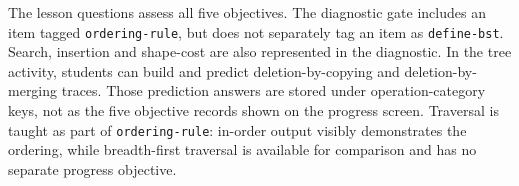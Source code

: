 The lesson questions assess all five objectives. The diagnostic gate includes an item tagged \texttt{ordering-rule}, but does not separately tag an item as \texttt{define-bst}. Search, insertion and shape-cost are also represented in the diagnostic. In the tree activity, students can build and predict deletion-by-copying and deletion-by-merging traces. Those prediction answers are stored under operation-category keys, not as the five objective records shown on the progress screen. Traversal is taught as part of \texttt{ordering-rule}: in-order output visibly demonstrates the ordering, while breadth-first traversal is available for comparison and has no separate progress objective.